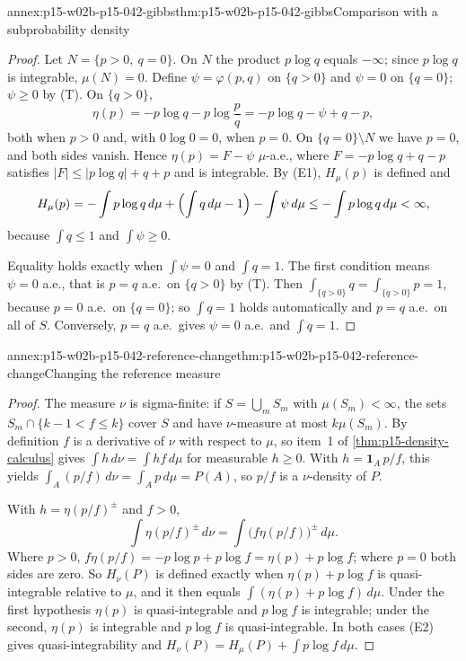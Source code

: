 \begin{annexitem}{annex:p15-w02b-p15-042-gibbs}{thm:p15-w02b-p15-042-gibbs}{Comparison with a subprobability density}
\begin{proof}
Let \(N=\{p>0,\ q=0\}\). On \(N\) the product \(p\log q\) equals \(-\infty\);
since \(p\log q\) is integrable, \(\mu(N)=0\). Define \(\psi=\varphi(p,q)\)
on \(\{q>0\}\) and \(\psi=0\) on \(\{q=0\}\); \(\psi\geq0\) by (T). On
\(\{q>0\}\),
\[
 \eta(p)=-p\log q-p\log\frac pq=-p\log q-\psi+q-p ,
\]
both when \(p>0\) and, with \(0\log0=0\), when \(p=0\). On
\(\{q=0\}\setminus N\) we have \(p=0\), and both sides vanish. Hence
\(\eta(p)=F-\psi\) \(\mu\)-a.e., where \(F=-p\log q+q-p\) satisfies
\(|F|\leq|p\log q|+q+p\) and is integrable. By (E1), \(H_\mu(p)\) is defined
and
\[
 H_\mu(p)=-\int p\log q\,d\mu+\Bigl(\int q\,d\mu-1\Bigr)-\int\psi\,d\mu
         \leq-\int p\log q\,d\mu<\infty ,
\]
because \(\int q\leq1\) and \(\int\psi\geq0\).

Equality holds exactly when \(\int\psi=0\) and \(\int q=1\). The first
condition means \(\psi=0\) a.e., that is \(p=q\) a.e.\ on \(\{q>0\}\) by (T).
Then \(\int_{\{q>0\}}q=\int_{\{q>0\}}p=1\), because \(p=0\) a.e.\ on
\(\{q=0\}\); so \(\int q=1\) holds automatically and \(p=q\) a.e.\ on all of
\(S\). Conversely, \(p=q\) a.e.\ gives \(\psi=0\) a.e.\ and \(\int q=1\).
\end{proof}
\end{annexitem}

\begin{annexitem}{annex:p15-w02b-p15-042-reference-change}{thm:p15-w02b-p15-042-reference-change}{Changing the reference measure}
\begin{proof}
The measure \(\nu\) is sigma-finite: if \(S=\bigcup_mS_m\) with
\(\mu(S_m)<\infty\), the sets \(S_m\cap\{k-1<f\leq k\}\) cover \(S\) and have
\(\nu\)-measure at most \(k\mu(S_m)\). By definition \(f\) is a derivative of
\(\nu\) with respect to \(\mu\), so item~1 of \cref{thm:p15-density-calculus}
gives \(\int h\,d\nu=\int hf\,d\mu\) for measurable \(h\geq0\). With
\(h=\mathbf 1_A\,p/f\), this yields \(\int_A(p/f)\,d\nu=\int_Ap\,d\mu=P(A)\),
so \(p/f\) is a \(\nu\)-density of \(P\).

With \(h=\eta(p/f)^\pm\) and \(f>0\),
\[
 \int\eta(p/f)^\pm\,d\nu=\int\bigl(f\eta(p/f)\bigr)^\pm\,d\mu .
\]
Where \(p>0\), \(f\eta(p/f)=-p\log p+p\log f=\eta(p)+p\log f\); where
\(p=0\) both sides are zero. So \(H_\nu(P)\) is defined exactly when
\(\eta(p)+p\log f\) is quasi-integrable relative to \(\mu\), and it then
equals \(\int(\eta(p)+p\log f)\,d\mu\). Under the first hypothesis
\(\eta(p)\) is quasi-integrable and \(p\log f\) is integrable; under the
second, \(\eta(p)\) is integrable and \(p\log f\) is quasi-integrable. In
both cases (E2) gives quasi-integrability and
\(H_\nu(P)=H_\mu(P)+\int p\log f\,d\mu\).
\end{proof}
\end{annexitem}

